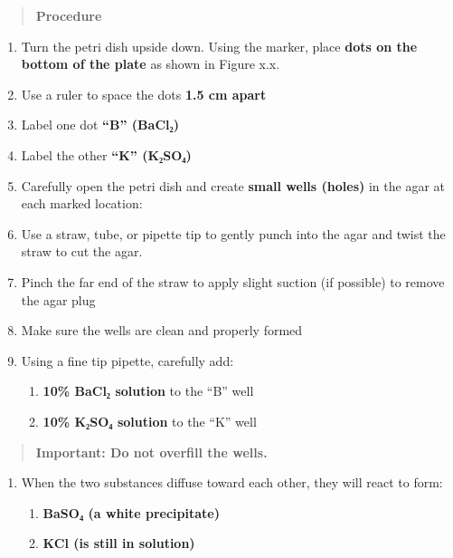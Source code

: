 \documentclass[
  letterpaper,
  DIV=11,
  numbers=noendperiod]{scrreprt}
\begin{document}
\begin{quote}
\textbf{Procedure}
\end{quote}

\begin{enumerate}
\def\labelenumi{\alph{enumi}.}
\item
  Turn the petri dish upside down. Using the marker, place \textbf{dots
  on the bottom of the plate} as shown in Figure x.x.
\item
  Use a ruler to space the dots \textbf{1.5 cm apart}
\item
  Label one dot \textbf{``B'' (BaCl₂)}
\item
  Label the other \textbf{``K'' (K₂SO₄)}
\item
  Carefully open the petri dish and create \textbf{small wells (holes)}
  in the agar at each marked location:
\item
  Use a straw, tube, or pipette tip to gently punch into the agar and
  twist the straw to cut the agar.
\item
  Pinch the far end of the straw to apply slight suction (if possible)
  to remove the agar plug
\item
  Make sure the wells are clean and properly formed
\item
  Using a fine tip pipette, carefully add:

  \begin{enumerate}
  \def\labelenumii{\arabic{enumii}.}
  \item
    \textbf{10\% BaCl₂ solution} to the ``B'' well
  \item
    \textbf{10\% K₂SO₄ solution} to the ``K'' well
  \end{enumerate}
\end{enumerate}

\begin{quote}
\textbf{Important: Do not overfill the wells.}

\textbf{\hfill\break
}
\end{quote}

\begin{enumerate}
\def\labelenumi{\alph{enumi}.}
\setcounter{enumi}{9}
\item
  When the two substances diffuse toward each other, they will react to
  form:

  \begin{enumerate}
  \def\labelenumii{\arabic{enumii}.}
  \item
    \textbf{BaSO₄ (a white precipitate)}
  \item
    \textbf{KCl (is still in solution)}
  \end{enumerate}
\end{enumerate}
\end{document}
